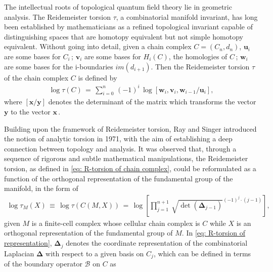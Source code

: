 \par The intellectual roots of topological quantum field theory lie in geometric analysis. The Reidemeister torsion $\tau$, a combinatorial manifold invariant, has long been established by mathematicians as a refined topological invariant capable of distinguishing spaces that are homotopy equivalent but not simple homotopy equivalent. Without going into detail, given a chain complex $C=(C_n,d_n)$, $\mathbf{u}_i$ are some bases for $C_i$\,; $\mathbf{v}_i$ are some bases for $H_i(C)$, the homologies of $C$\,; $\mathbf{w}_i$ are some bases for the i-boundaries $im(d_{i+1})$. Then the Reidemeister torsion $\tau$ of the chain complex $C$ is defined by
\begin{equation}\label{eq: R-torsion of chain complex}
    \begin{split}
        \log{\tau (C)}\,=\,\sum_{i=0}^{n} \,(-1)^i\,\log\left[ \mathbf{w}_i,\mathbf{v}_i,\mathbf{w}_{i-1}/\mathbf{u}_i\right],
    \end{split}
\end{equation}
where $\left[\mathbf{x}/\mathbf{y}\right]$ denotes the determinant of the matrix which transforms the vector $\mathbf{y}$ to the vector $\mathbf{x}$\,\cite{milnor1966}. 
\par Building upon the framework of Reidemeister torsion, Ray and Singer introduced the notion of analytic torsion in 1971, with the aim of establishing a deep connection between topology and analysis. It was observed that, through a sequence of rigorous and subtle mathematical manipulations, the Reidemeister torsion, as defined in \eqref{eq: R-torsion of chain complex}, could be reformulated as a function of the orthogonal representation of the fundamental group of the manifold, in the form of
\begin{equation}\label{eq: R-torsion of representation}
    \begin{split}
        \log{\tau_M (X)}\,\equiv\,\log{\tau\left(C\left(M,X\right)\right)}\,=\,
        \log{\left[\prod_{j=1}^{n+1}\,\sqrt{\det(\mathbf\Delta_{j-1})}^{(-1)^j\cdot(j-1)}\right]},
    \end{split}
\end{equation}
given $M$ is a finite-cell complex whose cellular chain complex is $C$ while $X$ is an orthogonal representation of the fundamental group of $M$. In \eqref{eq: R-torsion of representation}, $\mathbf{\Delta}_j$ denotes the coordinate representation of the combinatorial Laplacian $\mathbf{\Delta}$ with respect to a given basis on $C_j$, which can be defined in terms of the boundary operator $\mathcal{B}$ on $C$ as
